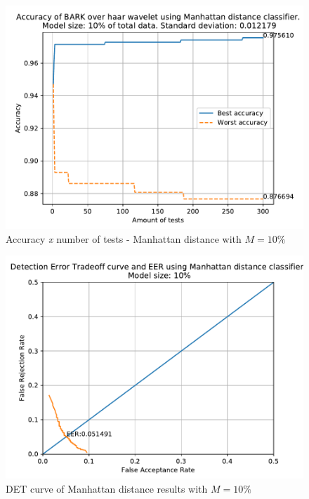 		\begin{figure}[H]
			\centering
			\includegraphics[scale=.8]{images/results/confusionMatrices/classifier_Manhattan_10.pdf}
			\caption{Accuracy \textit{x} number of tests - Manhattan distance with $M=10\%$}
			\label{fig:classifiermanhattan10}
		\end{figure}
		\begin{figure}[H]
			\centering
			\includegraphics[scale=.8]{images/results/det/DET_for_classifier_Manhattan_10.pdf}
			\caption{DET curve of Manhattan distance results with $M=10\%$}
			\label{fig:detforclassifiermanhattan10}
		\end{figure}
